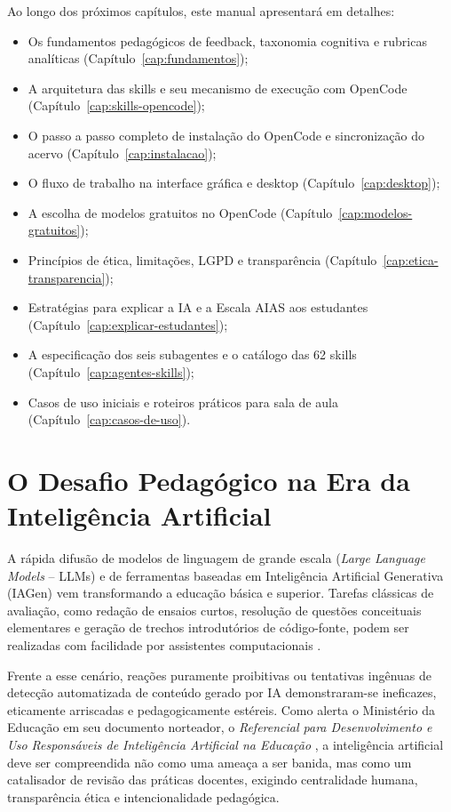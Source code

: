 Ao longo dos pr{\'o}ximos cap{\'i}tulos, este manual apresentar{\'a} em detalhes:
\begin{itemize}
  \item Os fundamentos pedag{\'o}gicos de feedback, taxonomia cognitiva e rubricas anal{\'i}ticas (Cap{\'i}tulo~\ref{cap:fundamentos});
  \item A arquitetura das skills e seu mecanismo de execu{\c c}{\~a}o com OpenCode (Cap{\'i}tulo~\ref{cap:skills-opencode});
  \item O passo a passo completo de instala{\c c}{\~a}o do OpenCode e sincroniza{\c c}{\~a}o do acervo (Cap{\'i}tulo~\ref{cap:instalacao});
  \item O fluxo de trabalho na interface gr{\'a}fica e desktop (Cap{\'i}tulo~\ref{cap:desktop});
  \item A escolha de modelos gratuitos no OpenCode (Cap{\'i}tulo~\ref{cap:modelos-gratuitos});
  \item Princ{\'i}pios de {\'e}tica, limita{\c c}{\~o}es, LGPD e transpar{\^e}ncia (Cap{\'i}tulo~\ref{cap:etica-transparencia});
  \item Estrat{\'e}gias para explicar a IA e a Escala AIAS aos estudantes (Cap{\'i}tulo~\ref{cap:explicar-estudantes});
  \item A especifica{\c c}{\~a}o dos seis subagentes e o cat{\'a}logo das 62 skills (Cap{\'i}tulo~\ref{cap:agentes-skills});
  \item Casos de uso iniciais e roteiros pr{\'a}ticos para sala de aula (Cap{\'i}tulo~\ref{cap:casos-de-uso}).
\end{itemize}

\section{O Desafio Pedag{\'o}gico na Era da Intelig{\^e}ncia Artificial}

A r{\'a}pida difus{\~a}o de modelos de linguagem de grande escala (\emph{Large Language Models} -- LLMs) e de ferramentas baseadas em Intelig{\^e}ncia Artificial Generativa (IAGen) vem transformando a educa{\c c}{\~a}o b{\'a}sica e superior. Tarefas cl{\'a}ssicas de avalia{\c c}{\~a}o, como reda{\c c}{\~a}o de ensaios curtos, resolu{\c c}{\~a}o de quest{\~o}es conceituais elementares e gera{\c c}{\~a}o de trechos introdut{\'o}rios de c{\'o}digo-fonte, podem ser realizadas com facilidade por assistentes computacionais \cite{unesco2021guidance,mollick2024instructors}.

Frente a esse cen{\'a}rio, rea{\c c}{\~o}es puramente proibitivas ou tentativas ing{\^e}nuas de detec{\c c}{\~a}o automatizada de conte{\'u}do gerado por IA demonstraram-se ineficazes, eticamente arriscadas e pedagogicamente est{\'e}reis. Como alerta o Minist{\'e}rio da Educa{\c c}{\~a}o em seu documento norteador, o \emph{Referencial para Desenvolvimento e Uso Respons{\'a}veis de Intelig{\^e}ncia Artificial na Educa{\c c}{\~a}o} \cite{brasil2026referencial}, a intelig{\^e}ncia artificial deve ser compreendida n{\~a}o como uma amea{\c c}a a ser banida, mas como um catalisador de revis{\~a}o das pr{\'a}ticas docentes, exigindo centralidade humana, transpar{\^e}ncia {\'e}tica e intencionalidade pedag{\'o}gica.

